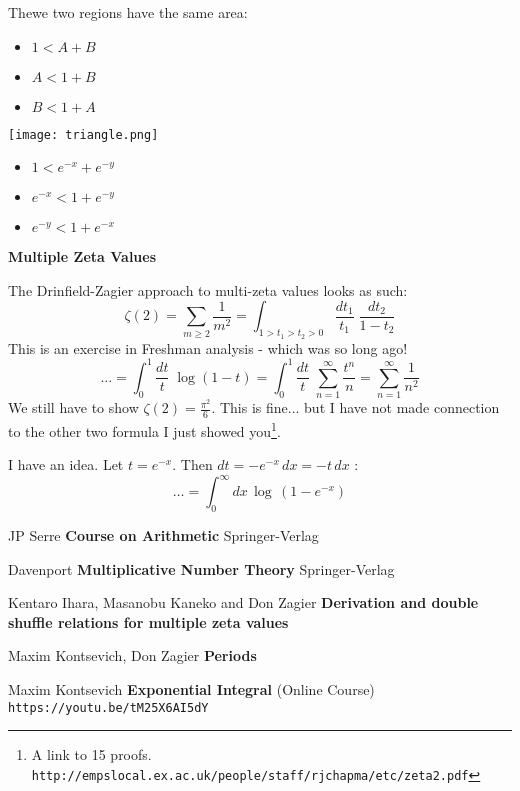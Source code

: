 \documentclass[12pt]{article}
\begin{document}
Thewe two regions have the same area:
\begin{itemize}
\item $1 < A + B$
\item $A < 1 + B$
\item $B < 1 + A$
\end{itemize}


\texttt{[image: triangle.png]}
\begin{itemize}
\item $1 < e^{-x} + e^{-y}$
\item $ e^{-x} < 1 +  e^{-y}$
\item $ e^{-y} < 1 +  e^{-x}$
\end{itemize}

\newpage

\noindent \textbf{Multiple Zeta Values} \newline

\noindent The Drinfield-Zagier approach to multi-zeta values looks as such:
$$\zeta(2) = \sum_{m \geq 2} \frac{1}{m^2} 
= \int_{1 >  t_1 > t_2 > 0} 
\frac{dt_1}{t_1} \; \frac{dt_2}{1 - t_2} 
 $$
This is an exercise in Freshman analysis - which was so long ago!
$$ \dots = \int_0^1
\frac{dt}{t} \; \log (1-t) 
= \int_0^1
\frac{dt}{t} \; \sum_{ n = 1}^\infty \frac{t^n}{n}
= \sum_{ n = 1}^\infty \frac{1}{n^2}
$$
We still have to show $\zeta(2) = \frac{\pi^2}{6}$.  This is fine... but I have not made connection to the other two formula I just showed you\footnote{A link to 15 proofs. \texttt{http://empslocal.ex.ac.uk/people/staff/rjchapma/etc/zeta2.pdf}}. \newline

\noindent  I have an idea. Let $t = e^{-x}$.  Then $dt = - e^{-x} \, dx = - t \, dx $ :
$$ \dots = \int_0^\infty dx\,  \log \, ( 1 - e^{-x}) $$


\newpage

\selectfont \fontsize{12}{10}\selectfont

\begin{thebibliography}{}

\item JP Serre \textbf{Course on Arithmetic} Springer-Verlag

\item Davenport \textbf{Multiplicative Number Theory} Springer-Verlag

\item Kentaro Ihara, Masanobu Kaneko and Don Zagier \textbf{Derivation and double shuffle relations for multiple zeta values} 

\item Maxim Kontsevich, Don Zagier \textbf{Periods}  
\item Maxim Kontsevich \textbf{Exponential Integral} (Online Course) \texttt{https://youtu.be/tM25X6AI5dY}



\end{thebibliography}
\end{document}
